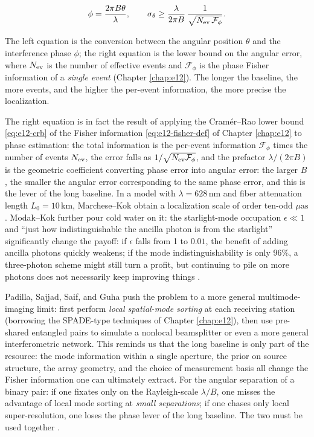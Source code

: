 \begin{equation}
  \phi=\frac{2\pi B\theta}{\lambda},
  \qquad
  \sigma_\theta
  \ge
  \frac{\lambda}{2\pi B}\,
  \frac{1}{\sqrt{N_{\rm ev}\,\mathcal F_\phi}} .
  \label{eq:e24-angle-fisher}
\end{equation}
\begin{formulaexplain}
The left equation is the conversion between the angular position \(\theta\) and the interference phase \(\phi\); the right equation is the lower bound on the angular error, where \(N_{\rm ev}\) is the number of effective events and \(\mathcal F_\phi\) is the phase Fisher information of a \emph{single event} (Chapter \ref{chap:e12}). The longer the baseline, the more events, and the higher the per-event information, the more precise the localization.
\end{formulaexplain}

The right equation is in fact the result of applying the Cramér--Rao lower bound \eqref{eq:e12-crb} of the Fisher information \eqref{eq:e12-fisher-def} of Chapter \ref{chap:e12} to phase estimation: the total information is the per-event information \(\mathcal F_\phi\) times the number of events \(N_{\rm ev}\), the error falls as \(1/\sqrt{N_{\rm ev}\mathcal F_\phi}\), and the prefactor \(\lambda/(2\pi B)\) is the geometric coefficient converting phase error into angular error: the larger \(B\), the smaller the angular error corresponding to the same phase error, and this is the lever of the long baseline. In a model with \(\lambda=628\,\mathrm{nm}\) and fiber attenuation length \(L_0=10\,\mathrm{km}\), Marchese--Kok obtain a localization scale of order ten-odd \(\mu\mathrm{as}\). Modak--Kok further pour cold water on it: the starlight-mode occupation \(\epsilon\ll1\) and ``just how indistinguishable the ancilla photon is from the starlight'' significantly change the payoff: if \(\epsilon\) falls from 1 to \(0.01\), the benefit of adding ancilla photons quickly weakens; if the mode indistinguishability is only \(96\%\), a three-photon scheme might still turn a profit, but continuing to pile on more photons does not necessarily keep improving things \citep{2023PhRvL.130p0801M,2025PhRvA.111d3701M}.

Padilla, Sajjad, Saif, and Guha push the problem to a more general multimode-imaging limit: first perform \emph{local spatial-mode sorting} at each receiving station (borrowing the SPADE-type techniques of Chapter \ref{chap:e12}), then use pre-shared entangled pairs to simulate a nonlocal beamsplitter or even a more general interferometric network. This reminds us that the long baseline is only part of the resource: the mode information within a single aperture, the prior on source structure, the array geometry, and the choice of measurement basis all change the Fisher information one can ultimately extract. For the angular separation of a binary pair: if one fixates only on the Rayleigh-scale \(\lambda/B\), one misses the advantage of local mode sorting at \emph{small separations}; if one chases only local super-resolution, one loses the phase lever of the long baseline. The two must be used together \citep{2026PhRvA.113a2608P,2025PhRvR...7d3278Z}.

